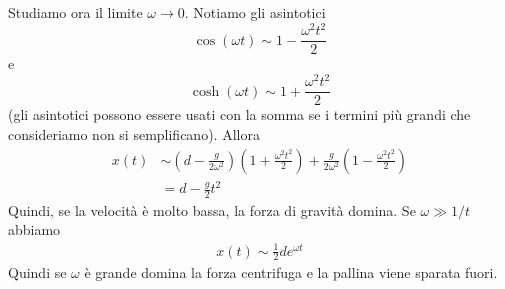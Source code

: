 \documentclass[a4paper]{article}
\begin{document}
{    Studiamo ora il limite \(\omega \to 0\).
    Notiamo gli asintotici
    \[
        \cos(\omega t) \sim 1 - \frac{\omega^2 t^2}{2}
    \] e
    \[
        \cosh(\omega t) \sim 1 + \frac{\omega^2 t^2}{2}
    \]
    (gli asintotici possono essere usati con la somma se i termini più grandi che consideriamo non si semplificano).
    Allora
    \begin{align*}
        x(t) &\sim \left(d - \frac{g}{2\omega^2}\right)
        \left(1 + \frac{\omega^2t^2}{2}\right)
        + \frac{g}{2\omega^2}\left(1 - \frac{\omega^2t^2}{2}\right) \\
        &= d - \frac{g}{2}t^2
    \end{align*}
    Quindi, se la velocità è molto bassa, la forza di gravità domina.
    Se \(\omega \gg 1/t\) abbiamo
    \begin{align*}
        x(t) \sim \frac{1}{2}de^{\omega t}
    \end{align*}
    Quindi se \(\omega\) è grande domina la forza centrifuga e la pallina viene sparata fuori.
}

\end{document}
